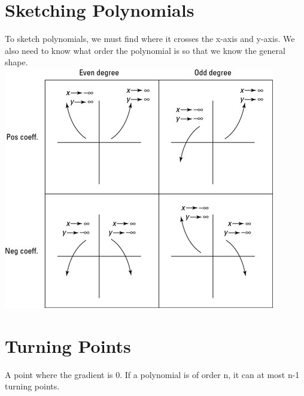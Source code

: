 \documentclass[a4paper,12pt]{article}
\begin{document}
\section*{Sketching Polynomials}
To sketch polynomials, we must find where it crosses the x-axis and y-axis. We also need to know what order the polynomial is so that we know the general shape.  \\
\includegraphics[scale=0.7]{Graphs}
\section*{Turning Points}
A point where the gradient is 0. If a polynomial is of order n, it can at most n-1 turning points. 
\end{document}
